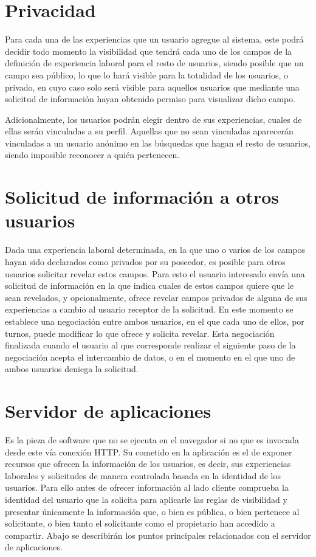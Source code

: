 \documentclass[a4paper, 12pt]{book}
\begin{document}
\section{Privacidad}
\label{sec:intro_privacity}
Para cada una de las experiencias que un usuario agregue al sistema, este podrá decidir todo momento la visibilidad que tendrá cada uno de los campos de la definición de experiencia laboral para el resto de usuarios, siendo posible que un campo sea público, lo que lo hará visible para la totalidad de los usuarios, o privado, en cuyo caso solo será visible para aquellos usuarios que mediante  una solicitud de información hayan obtenido permiso para visualizar dicho campo.

Adicionalmente, los usuarios podrán elegir dentro de sus experiencias, cuales de ellas serán vinculadas a su perfil. Aquellas que no sean vinculadas aparecerán vinculadas a un usuario anónimo en las búsquedas que hagan el resto de usuarios, siendo imposible reconocer a quién pertenecen.

\section{Solicitud de información a otros usuarios}
\label{sec:intro_inforequest}
Dada una experiencia laboral determinada, en la que uno o varios de los campos hayan sido declarados como privados por su poseedor, es posible para otros usuarios solicitar revelar estos campos. 
Para esto el usuario interesado envía una solicitud de información en la que indica cuales de estos campos quiere que le sean revelados, y opcionalmente, ofrece revelar campos privados de alguna de sus experiencias a cambio al usuario receptor de la solicitud.
En este momento se establece una negociación entre ambos usuarios, en el que cada uno de ellos, por turnos, puede modificar lo que ofrece y solicita revelar. Esta negociación finalizada cuando el usuario al que corresponde realizar el siguiente paso de la negociación acepta el intercambio de datos, o en el momento en el que uno de ambos usuarios deniega la solicitud.


\section{Servidor de aplicaciones}
\label{sec:intro_applicationserver}

Es la pieza de software que no se ejecuta en el navegador si no que es invocada desde este vía conexión HTTP. 
Su cometido en la aplicación es el de exponer recursos que ofrecen la información de los usuarios, es decir, sus experiencias laborales y solicitudes de manera controlada basada en la identidad de los usuarios. 
Para ello antes de ofrecer información al lado cliente comprueba la identidad del usuario que la solicita para aplicarle las reglas de visibilidad y presentar únicamente la información que, 
o bien es pública, o bien pertenece al solicitante, o bien tanto el solicitante como el propietario han accedido a compartir. Abajo se describirán los puntos principales relacionados con el servidor de aplicaciones.
\end{document}
